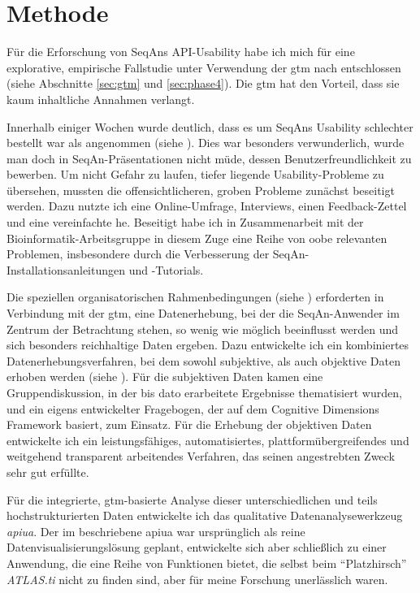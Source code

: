 \section{Methode}
Für die Erforschung von SeqAns API-Usability habe ich mich für eine explorative, empirische Fallstudie unter Verwendung der \gls{gtm} nach \cite{strauss1990basics} entschlossen (siehe Abschnitte \ref{sec:gtm} und \ref{sec:phase4}). Die \gls{gtm} hat den Vorteil, dass sie kaum inhaltliche Annahmen verlangt.

Innerhalb einiger Wochen wurde deutlich, dass es um SeqAns Usability schlechter bestellt war als angenommen (siehe ). Dies war besonders verwunderlich, wurde man doch in SeqAn-Präsentationen nicht müde, dessen Benutzerfreundlichkeit zu bewerben. Um nicht Gefahr zu laufen, tiefer liegende Usability-Probleme zu übersehen, mussten die offensichtlicheren, groben Probleme zunächst beseitigt werden. Dazu nutzte ich eine Online-Umfrage, Interviews, einen Feedback-Zettel und eine vereinfachte \gls{he}. Beseitigt habe ich in Zusammenarbeit mit der Bioinformatik-Arbeitsgruppe in diesem Zuge eine Reihe von \gls{oobe} relevanten Problemen, insbesondere durch die Verbesserung der SeqAn-Installationsanleitungen und -Tutorials.

Die speziellen organisatorischen Rahmenbedingungen (siehe ) erforderten in Verbindung mit der \gls{gtm}, eine Datenerhebung, bei der die SeqAn-Anwender im Zentrum der Betrachtung stehen, so wenig wie möglich beeinflusst werden und sich besonders reichhaltige Daten ergeben. Dazu entwickelte ich ein kombiniertes Datenerhebungsverfahren, bei dem sowohl subjektive, als auch objektive Daten erhoben werden (siehe ). Für die subjektiven Daten kamen eine Gruppendiskussion, in der bis dato erarbeitete Ergebnisse thematisiert wurden, und ein eigens entwickelter Fragebogen, der auf dem Cognitive Dimensions Framework basiert, zum Einsatz. Für die Erhebung der objektiven Daten entwickelte ich ein leistungsfähiges, automatisiertes, plattformübergreifendes und weitgehend transparent arbeitendes Verfahren, das seinen angestrebten Zweck sehr gut erfüllte.

Für die integrierte, \gls{gtm}-basierte Analyse dieser unterschiedlichen und teils hochstrukturierten Daten entwickelte ich das qualitative Datenanalysewerkzeug \textit{\gls{apiua}}. Der im  beschriebene \gls{apiua} war ursprünglich als reine Datenvisualisierungslösung geplant, entwickelte sich aber schließlich zu einer Anwendung, die eine Reihe von Funktionen bietet, die selbst beim ``Platzhirsch'' \textit{ATLAS.ti} nicht zu finden sind, aber für meine Forschung unerlässlich waren.

